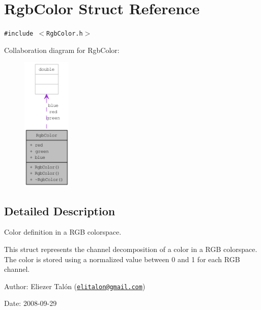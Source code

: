 \hypertarget{struct_rgb_color}{
\section{RgbColor Struct Reference}
\label{struct_rgb_color}
}
{\tt \#include $<$RgbColor.h$>$}

Collaboration diagram for RgbColor:\nopagebreak
\begin{figure}[H]
\begin{center}
\leavevmode
\includegraphics[width=65pt]{struct_rgb_color__coll__graph}
\end{center}
\end{figure}


\subsection{Detailed Description}
Color definition in a RGB colorspace. 

This struct represents the channel decomposition of a color in a RGB colorspace. The color is stored using a normalized value between 0 and 1 for each RGB channel.

\begin{Desc}
\item[Author:]Eliezer Talón (\href{mailto:elitalon@gmail.com}{\tt elitalon@gmail.com}) \end{Desc}
\begin{Desc}
\item[Date:]2008-09-29 \end{Desc}


